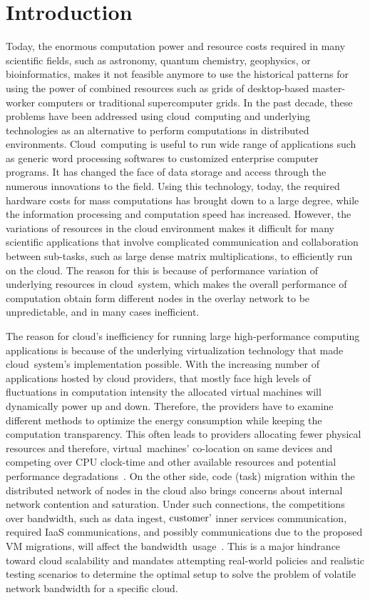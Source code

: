 \documentclass{sig-alternate}
\begin{document}
\section{Introduction}
Today, the enormous computation power and resource costs required in many scientific fields, such as astronomy, quantum chemistry, geophysics, or bioinformatics, makes it not feasible anymore to use the historical patterns for using the power of combined resources such as grids of desktop-based master-worker computers or traditional supercomputer grids. In the past decade, these problems have been addressed using cloud~computing and underlying technologies as an alternative to perform computations in distributed environments. Cloud~computing is useful to run wide range of applications such as generic word processing softwares to customized enterprise computer programs. It has changed the face of data storage and access through the numerous innovations to the field. Using this technology, today, the required hardware costs for mass computations has brought down to a large degree, while the information processing and computation speed has increased. However, the variations of resources in the cloud environment makes it difficult for many scientific applications that involve complicated communication and collaboration between sub-tasks, such as large dense matrix multiplications, to efficiently run on the cloud. The reason for this is because of performance variation of underlying resources in cloud~system, which makes the overall performance of computation obtain form different nodes in the overlay network to be unpredictable, and in many cases inefficient.

The reason for cloud's inefficiency for running large high-performance computing applications is because of the underlying virtualization technology that made cloud~system's implementation possible. With the increasing number of applications hosted by cloud providers, that mostly face high levels of fluctuations in computation intensity the allocated virtual machines will dynamically power up and down. Therefore, the providers have to examine different methods to optimize the energy consumption while keeping the computation transparency. This often leads to providers allocating fewer physical resources and therefore, virtual~machines' co-location on same devices and competing over CPU clock-time and other available resources and potential performance degradations~\cite{papadopoulos:virtual}. On the other side, code (task) migration within the distributed network of nodes in the cloud also brings concerns about internal network contention and saturation. Under such connections, the competitions over bandwidth, such as data ingest, $\textnormal{customer'}$ inner services communication, required IaaS communications, and possibly communications due to the proposed VM migrations, will affect the bandwidth~usage~\cite{raycroft:Performance}. This is a major hindrance toward cloud scalability and mandates attempting real-world policies and realistic testing scenarios to determine the optimal setup to solve the problem of volatile network bandwidth for a specific cloud.
\end{document}
